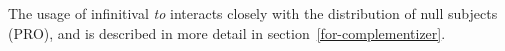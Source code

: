 
The usage of infinitival {\em to} interacts closely with the distribution of
null subjects (PRO), and is described in more detail in
section~\ref{for-complementizer}.






